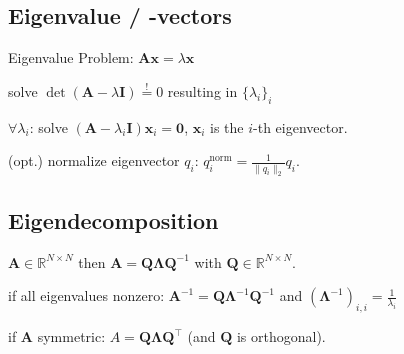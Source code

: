 \documentclass[a4paper, 11pt, landscape]{article}
\begin{document}
\begin{multicols*}{3}

\subsection{Eigenvalue / -vectors}
Eigenvalue Problem: $\mathbf{Ax} = \lambda \mathbf{x}$
\begin{compactenum}
	\item solve $\operatorname{det}(\mathbf{A} - \lambda \mathbf{I}) \overset{!}{=} 0$ resulting in $\{\lambda_i\}_i$
	\item $\forall \lambda_i$:
		solve $(\mathbf{A} - \lambda_i \mathbf{I}) \mathbf{x}_i = \mathbf{0}$, $\mathbf{x}_i$ is the $i$-th eigenvector.
	\item (opt.) normalize eigenvector $q_i$: $q_i^{\text{norm}} = \frac{1}{\|q_i\|_2} q_i$.
\end{compactenum}

\subsection{Eigendecomposition}
\begin{inparaitem}[\color{red}\textbullet]
  \item $\mathbf{A} \in \mathbb{R}^{N \times N}$ then $\mathbf{A} = \mathbf{Q} \boldsymbol{\Lambda} \mathbf{Q}^{-1}$ with $\mathbf{Q} \in \mathbb{R}^{N \times N}$.
  \item if all eigenvalues nonzero: $\mathbf{A}^{-1} = \mathbf{Q} \boldsymbol{\Lambda}^{-1} \mathbf{Q}^{-1}$ and $(\boldsymbol{\Lambda}^{-1})_{i,i} = \frac{1}{\lambda_i}$
  \item if $\mathbf{A}$ symmetric: $A = \mathbf{Q} \boldsymbol{\Lambda} \mathbf{Q^\top}$ (and $\mathbf{Q}$ is orthogonal).
\end{inparaitem}


\end{multicols*}
\end{document}
